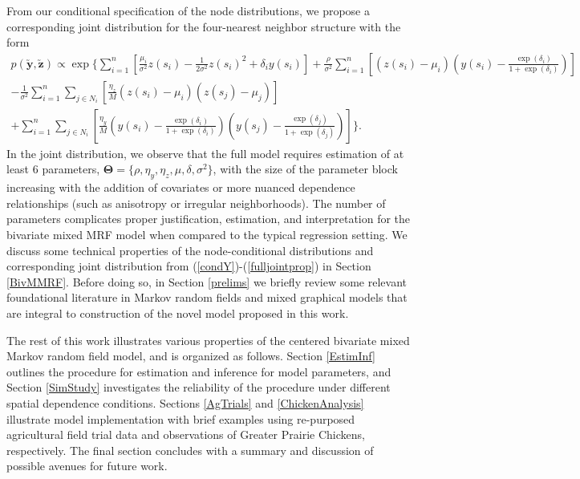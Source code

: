\documentclass[12pt, a4paper, twoside]{article}
\begin{document}
From our conditional specification of the node distributions, we propose a corresponding joint distribution for the four-nearest neighbor structure with the form
\begin{multline} \label{fulljointprop}
p(\boldsymbol{\utilde{y},\utilde{z}}) \propto \exp\lbrace \sum_{i = 1}^{n} \left[\frac{\mu_i}{\sigma^2}z(s_i) - \frac{1}{2\sigma^2}z(s_i)^2 + \delta_i y(s_i)\right] +  \frac{\rho}{\sigma^2} \sum_{i = 1}^{n} \left[\left(z(s_i)-\mu_i\right)\left(y(s_i) - \frac{\exp{(\delta_i)}}{1+\exp{(\delta_i)}}\right)\right]\\
-\frac{1}{\sigma^2}\sum_{i=1}^{n}\sum_{j\in N_i}\left[ \frac{\eta_z}{M}\left( z(s_i)-\mu_i\right)\left(z(s_j)-\mu_j \right)\right]\\
+ \sum_{i=1}^{n}\sum_{j\in N_i}\left[\frac{\eta_y}{M}\left(y(s_i) - \frac{\exp{(\delta_i)}}{1+\exp{(\delta_i)}}\right) \left(y(s_j) - \frac{\exp{(\delta_j)}}{1+\exp{(\delta_j)}}\right)\right] \rbrace .
\end{multline}
In the joint distribution, we observe that the full model requires estimation of at least 6 parameters, $\boldsymbol{\Theta}=\lbrace\rho,\eta_y,\eta_z,\mu,\delta,\sigma^2\rbrace$, with the size of the parameter block increasing with the addition of covariates or more nuanced dependence relationships (such as anisotropy or irregular neighborhoods). The number of parameters complicates proper justification, estimation, and interpretation for the bivariate mixed MRF model when compared to the typical regression setting. We discuss some technical properties of the node-conditional distributions and corresponding joint distribution from (\ref{condY})-(\ref{fulljointprop}) in Section \ref{BivMMRF}. Before doing so, in Section \ref{prelims} we briefly review some relevant foundational literature in Markov random fields and mixed graphical models that are integral to construction of the novel model proposed in this work.

The rest of this work illustrates various properties of the centered bivariate mixed Markov random field model, and is organized as follows. Section \ref{EstimInf} outlines the procedure for estimation and inference for model parameters, and Section \ref{SimStudy} investigates the reliability of the procedure under different spatial dependence conditions. Sections \ref{AgTrials} and \ref{ChickenAnalysis} illustrate model implementation with brief examples using re-purposed agricultural field trial data and observations of Greater Prairie Chickens, respectively. The final section concludes with a summary and discussion of possible avenues for future work.
\end{document}

